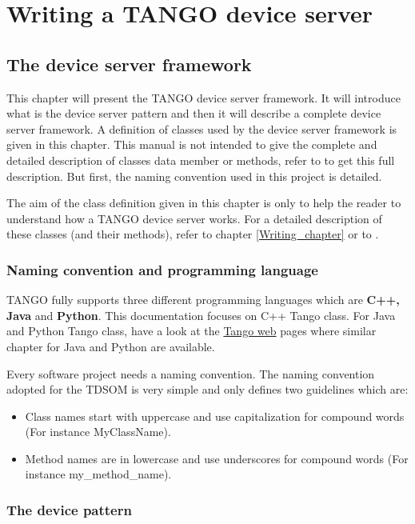 
\chapter{Writing a TANGO device server}

\section{The device server framework}

This chapter will present the TANGO device server framework. It will
introduce what is the device server pattern and then it will describe
a complete device server framework. A definition of classes used by
the device server framework is given in this chapter. This manual
is not intended to give the complete and detailed description of classes
data member or methods, refer to \cite{TANGO_ref_man} to get this
full description. But first, the naming convention used in this project
is detailed.

The aim of the class definition given in this chapter is only to help
the reader to understand how a TANGO device server works. For a detailed
description of these classes (and their methods), refer to chapter
\ref{Writing_chapter} or to \cite{TANGO_ref_man}.

\subsection{Naming convention and programming language}

TANGO fully supports three different programming languages which are
\textbf{C++, Java} and \textbf{Python}. This documentation focuses
on C++ Tango class. For Java and Python Tango class, have a look at
the \href{http://www.tango-controls.org}{Tango web} pages where similar
chapter for Java and Python are available.

Every software project needs a naming convention. The
naming convention adopted for the TDSOM is very simple and only defines
two guidelines which are:
\begin{itemize}
\item Class names start with uppercase and use capitalization for compound
words (For instance MyClassName).
\item Method names are in lowercase and use underscores for compound words
(For instance my\_method\_name).
\end{itemize}

\subsection{The device pattern}

